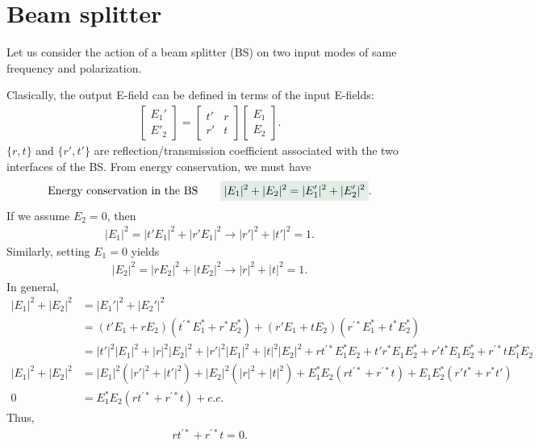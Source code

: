 \section{Beam splitter}

Let us consider the action of a beam splitter (BS) on two input modes of same frequency and polarization.

Clasically, the output E-field can be defined in terms of the input E-fields:
\begin{align*}
    \begin{bmatrix}
        E_1'\\E'_2
    \end{bmatrix}=\begin{bmatrix}
        t'&r\\r'&t
    \end{bmatrix}\begin{bmatrix}
        E_1\\E_2
    \end{bmatrix}.
\end{align*}
$\{r,t\}$ and $\{r',t'\}$ are reflection/transmission coefficient associated with the two interfaces of the BS. 
From energy conservation, we must have 
\begin{align*}
    \text{Energy conservation in the BS}\qquad\highlight{|E_1|^2+|E_2|^2=|E_1'|^2+|E_2'|^2}.
\end{align*}
If we assume $E_2=0$, then 
\begin{align}
    |E_1|^2=|t'E_1|^2+|r'E_1|^2\longrightarrow|r'|^2+|t'|^2=1.\label{eq:E20}
\end{align} 
Similarly, setting $E_1=0$ yields 
\begin{align}
    |E_2|^2=|rE_2|^2+|tE_2|^2\longrightarrow|r|^2+|t|^2=1.\label{eq:E10}
\end{align}
In general,
\begin{align*}
    |E_1|^2+|E_2|^2&=|E_1'|^2+|E_2'|^2\\
    &=(t'E_1+rE_2)(t^{'*}E_1^*+r^*E_2^*)+(r'E_1+tE_2)(r^{'*}E_1^*+t^*E_2^*)\\
    &=|t'|^2|E_1|^2+|r|^2|E_2|^2+|r'|^2|E_1|^2+|t|^2|E_2|^2+rt^{'*}E_1^*E_2+t'r^*E_1E_2^*+r't^*E_1E_2^*+r^{'*}tE_1^*E_2\\
    |E_1|^2+|E_2|^2&=|E_1|^2(|r'|^2+|t'|^2)+|E_2|^2(|r|^2+|t|^2)+E_1^*E_2(rt^{'*}+r^{'*}t)+E_1E_2^*(r't^*+r^*t')\\
    0&=E_1^*E_2(rt^{'*}+r^{'*}t)+c.c.
\end{align*}
Thus, 
\begin{align}
    rt^{'*}+r^{'*}t=0.\label{eq:E12}
\end{align}
